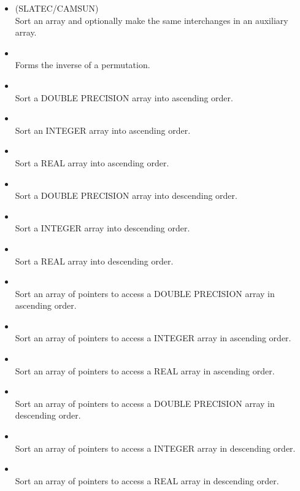 \begin{itemize}

\item {} (SLATEC/CAMSUN)\\
   Sort an array and optionally make the same interchanges in
   an auxiliary array.

\item {}\\
   Forms the inverse of a permutation.

\item {}\\
   Sort a DOUBLE PRECISION array into ascending order.
\item {}\\
   Sort an INTEGER array into ascending order.
\item {}\\
   Sort a REAL array into ascending order.
\item {}\\
   Sort a DOUBLE PRECISION array into descending order.
\item {}\\
   Sort a INTEGER array into descending order.
\item {}\\
   Sort a REAL array into descending order.
\item {}\\
   Sort an array of pointers to access a DOUBLE PRECISION array
   in ascending order.
\item {}\\
   Sort an array of pointers to access a INTEGER array
   in ascending order.
\item {}\\
   Sort an array of pointers to access a REAL array
   in ascending order.
\item {}\\
   Sort an array of pointers to access a DOUBLE PRECISION array in
   descending order.
\item {}\\
   Sort an array of pointers to access a INTEGER array in
   descending order.
\item {}\\
   Sort an array of pointers to access a REAL array in
   descending order.


\end{itemize}
